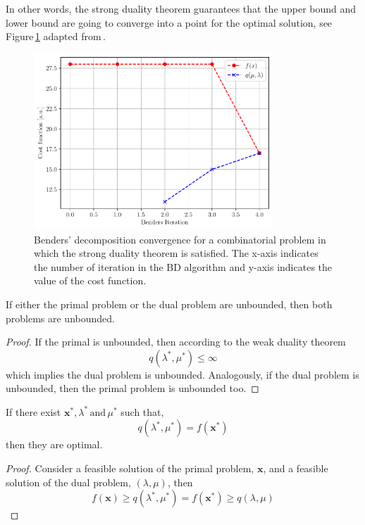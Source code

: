In other words, the strong duality theorem guarantees that the upper bound and lower bound are going to converge into a point for the optimal solution, see Figure\,\ref{fig:BD_Convergence} adapted from\,\cite{Zhao2021HybridProgramming}.
\begin{figure}[H]
\centering
\includegraphics[width=0.8\textwidth]{Figures/BD_Convergence.pdf} 
\caption{Benders' decomposition convergence for a combinatorial problem in which the strong duality theorem is satisfied. The x-axis indicates the number of iteration in the BD algorithm and y-axis indicates the value of the cost function.}
\label{fig:BD_Convergence}
\end{figure}
\begin{corollary}{}{}
If either the primal problem or the dual problem are unbounded, then both problems are unbounded.
\end{corollary}
\begin{proof}
If the primal is unbounded, then according to the weak duality theorem
\begin{equation}
    q(\lambda^{*}, \mu^{*}) \leq \infty
\end{equation}
which implies the dual problem is unbounded. Analogously, if the dual problem is unbounded, then the primal problem is unbounded too.
\end{proof}
\begin{corollary}{}{}
If there exist $\mathbf{x}^{*},\lambda^{*}\,\text{and}\, \mu^{*}$ such that,
\begin{equation}
    q(\lambda^{*}, \mu^{*}) = f(\mathbf{x}^{*})
\end{equation}
then they are optimal.
\end{corollary}
\begin{proof}
Consider a feasible solution of the primal problem, $\mathbf{x}$, and a feasible solution of the dual problem, $(\lambda, \mu)$, then
\begin{equation}
    f(\mathbf{x}) \geq q(\lambda^{*}, \mu^{*}) = f(\mathbf{x}^{*}) \geq q(\lambda, \mu)
\end{equation}
\end{proof}
